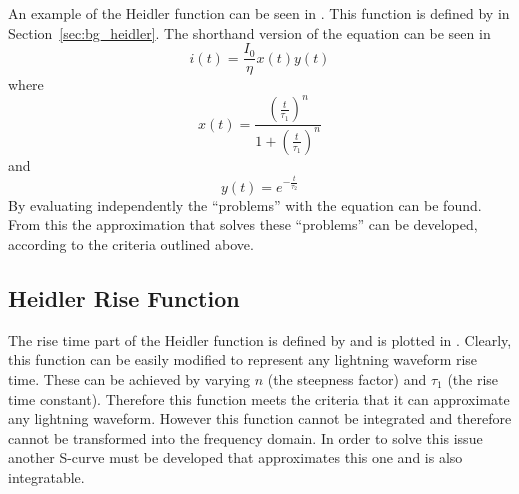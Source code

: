 An example of the Heidler function can be seen in . This function is defined by  in Section~\ref{sec:bg_heidler}.
The shorthand version of the equation can be seen in 
\begin{equation}
i(t) = \frac{I_0}{\eta} x \left( t \right) y \left( t \right)
\label{eqn:HFsmall}
\end{equation}
where
\begin{equation}
    x \left( t \right) = \frac{{\left (\frac{t}{\tau_1} \right )}^n}{1 + {\left (\frac{t}{\tau_1} \right )}^n}
    \label{eqn:HFrise}
\end{equation}
and
\begin{equation}
    y \left( t \right) = e^{-\frac{t}{\tau_2}}
    \label{eqn:HFfall}
\end{equation}
By evaluating  independently the ``problems'' with the equation can be found. From this the approximation that solves these ``problems'' can be developed, according to the criteria outlined above.

\subsection{Heidler Rise Function}
\label{sub:approx_heidler_rise_function}

The rise time part of the Heidler function is defined by  and is plotted in . Clearly, this function can be easily modified to represent any lightning waveform rise time. These can be achieved by varying $n$ (the steepness factor) and $\tau_1$ (the rise time constant).
Therefore this function meets the criteria that it can approximate any lightning waveform. However this function cannot be integrated and therefore cannot be transformed into the frequency domain. In order to solve this issue another S-curve must be developed that approximates this one and is also integratable.

